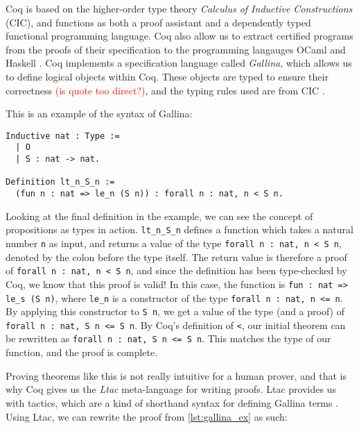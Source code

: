Coq is based on the higher-order type theory \textit{Calculus of Inductive Constructions} (CIC), and
functions as both a proof assistant and a dependently typed functional programming language.
Coq also allow us to extract certified programs from the proofs of their specification to
the programming langauges OCaml and Haskell \cite{cintro}.
Coq implements a specification language called \textit{Gallina},
which allows us to define logical objects within Coq.
These objects are typed to ensure their correctness \textcolor{red}{(is quote too direct?)},
and the typing rules used are from CIC \cite{cic}.

This is an example of the syntax of Gallina:

\begin{minipage}{\linewidth}
\begin{lstlisting}[language=Coq, label={lst:gallina_ex}, caption={Example of Gallina syntax}]
Inductive nat : Type :=
  | O
  | S : nat -> nat.

Definition lt_n_S_n :=
  (fun n : nat => le_n (S n)) : forall n : nat, n < S n.
\end{lstlisting}
\end{minipage}

Looking at the final definition in the example, we can see the
concept of propositions as types in action.
\lstinline{lt_n_S_n} defines a function which takes a natural number \lstinline{n}
as input, and returns a value of the type \lstinline{forall n : nat, n < S n},
denoted by the colon before the type itself.
The return value is therefore a proof of \lstinline{forall n : nat, n < S n}, and since
the definition has been type-checked by Coq, we know that this proof is valid!
In this case, the function is
\lstinline{fun : nat => le_s (S n)}, where \lstinline{le_n} is a constructor
of the type \lstinline{forall n : nat, n <= n}. By applying this constructor
to \lstinline{S n}, we get a value of the type (and a proof) of
\lstinline{forall n : nat, S n <= S n}. By Coq's definition of \lstinline{<},
our initial theorem can be rewritten as \lstinline{forall n : nat, S n <= S n}.
This matches the type of our function, and the proof is complete.

Proving theorems like this is not really intuitive for a human prover,
and that is why Coq gives us the \textit{Ltac} meta-language for writing proofs.
Ltac provides us with tactics, which are a kind of shorthand syntax for defining Gallina terms \cite{cltac}.
Using Ltac, we can rewrite the proof from \ref{lst:gallina_ex} as such:

